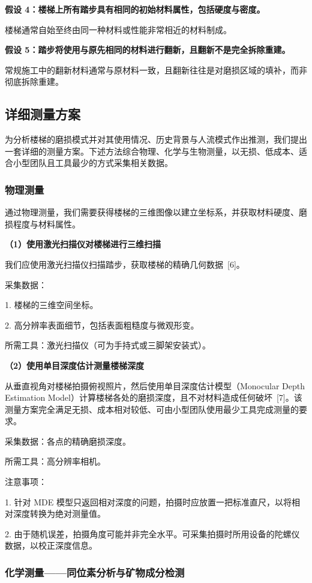 \documentclass[11pt,a4paper]{ctexart}
\newcommand{\runin}[1]{\par\noindent\textbf{#1}\par\nobreak}
\begin{document}
\textbf{假设 4：楼梯上所有踏步具有相同的初始材料属性，包括硬度与密度。}

楼梯通常自始至终由同一种材料或性能非常相近的材料制成。

\textbf{假设 5：踏步将使用与原先相同的材料进行翻新，且翻新不是完全拆除重建。}

常规施工中的翻新材料通常与原材料一致，且翻新往往是对磨损区域的填补，而非彻底拆除重建。

\subsection{详细测量方案}

为分析楼梯的磨损模式并对其使用情况、历史背景与人流模式作出推测，我们提出一套详细的测量方案。下述方法综合物理、化学与生物测量，以无损、低成本、适合小型团队且工具最少的方式采集相关数据。

\subsubsection{物理测量}

通过物理测量，我们需要获得楼梯的三维图像以建立坐标系，并获取材料硬度、磨损程度与材料属性。

\runin{（1）使用激光扫描仪对楼梯进行三维扫描}

我们应使用激光扫描仪扫描踏步，获取楼梯的精确几何数据\ [6]。

采集数据：

1. 楼梯的三维空间坐标。

2. 高分辨率表面细节，包括表面粗糙度与微观形变。

所需工具：激光扫描仪（可为手持式或三脚架安装式）。

\runin{（2）使用单目深度估计测量楼梯深度}

从垂直视角对楼梯拍摄俯视照片，然后使用单目深度估计模型（Monocular Depth Estimation Model）计算楼梯各处的磨损深度，且不对材料造成任何破坏\ [7]。该测量方案完全满足无损、成本相对较低、可由小型团队使用最少工具完成测量的要求。

采集数据：各点的精确磨损深度。

所需工具：高分辨率相机。

注意事项：

1. 针对 MDE 模型只返回相对深度的问题，拍摄时应放置一把标准直尺，以将相对深度转换为绝对测量值。

2. 由于随机误差，拍摄角度可能并非完全水平。可采集拍摄时所用设备的陀螺仪数据，以校正深度信息。

\subsubsection{化学测量——同位素分析与矿物成分检测}
\end{document}

